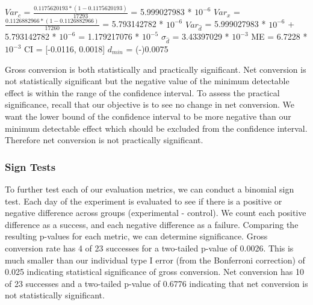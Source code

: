 \documentclass[paper=a4, fontsize=11pt]{scrartcl} %
\numberwithin{equation}{section} %
\numberwithin{figure}{section} %
\numberwithin{table}{section} %
\begin{document}
$Var_{c}$ = $\frac{0.1175620193 * (1 - 0.1175620193)}{17293}$ = 5.999027983 * $10^{-6}$
\newline
$Var_{x}$ = $\frac{0.1126882966 * (1 - 0.1126882966)}{17260}$ =  5.793142782 * $10^{-6}$
\newline
$Var_{\widehat{d}}$ = 5.999027983 * $10^{-6}$ + 5.793142782 * $10^{-6}$ = 1.179217076 * $10^{-5}$
\newline
\newline
$\sigma_{\widehat{d}}$ = 3.43397029 * $10^{-3}$
\newline
ME = 6.7228 * $10^{-3}$
\newline
CI = [-0.0116, 0.0018]
\newline
$d_{min}$ = (-)0.0075
\newline

Gross conversion is both statistically and practically significant.  Net conversion is not statistically significant but the negative value of the minimum detectable effect is within the range of the confidence interval.  To assess the practical significance, recall that our objective is to see no change in net conversion.  We want the lower bound of the confidence interval to be more negative than our minimum detectable effect which should be excluded from the confidence interval. Therefore net conversion is not practically significant. \newline


\subsubsection{Sign Tests}

To further test each of our evaluation metrics, we can conduct a binomial sign test.  Each day of the experiment is evaluated to see if there is a positive or negative difference across groups (experimental - control).  We count each positive difference as a success, and each negative difference as a failure.  Comparing the resulting p-values for each metric, we can determine significance.
Gross conversion rate has 4 of 23 successes for a two-tailed p-value of 0.0026.  This is much smaller than our individual type I error (from the Bonferroni correction) of 0.025 indicating statistical significance of gross conversion.  Net conversion has 10 of 23 successes and a two-tailed p-value of 0.6776 indicating that net conversion is not statistically significant.
\end{document}
